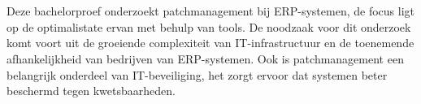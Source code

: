 
%
%
%
%
%

%



\chapter*{}


Deze bachelorproef onderzoekt patchmanagement bij ERP-systemen, de focus ligt op de optimalistate ervan met behulp van tools. De noodzaak voor dit onderzoek komt voort uit de groeiende complexiteit van IT-infrastructuur en de toenemende afhankelijkheid van bedrijven van ERP-systemen. Ook is patchmanagement een belangrijk onderdeel van IT-beveiliging, het zorgt ervoor dat systemen beter beschermd tegen kwetsbaarheden.

